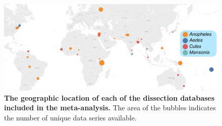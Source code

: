 \documentclass[12pt]{article}
\begin{document}
{\begin{figure}[ht]
	\centerline{\includegraphics[width=1.25\textwidth]{./Figure_files/dissection_map.pdf}}
	\caption{\textbf{The geographic location of each of the dissection databases included in the meta-analysis.} The area of the bubbles indicates the number of unique data series available.}\label{fig:dissection_map}
\end{figure}

}
\end{document}
